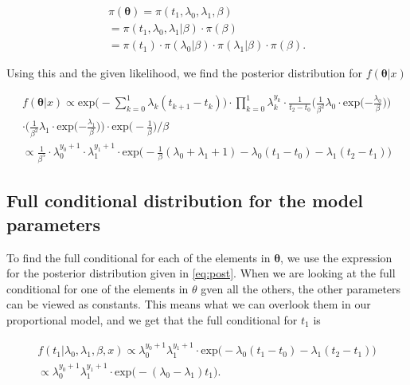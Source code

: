 \begin{align}
    \pi(\boldsymbol{\theta}) 
    = \pi(t_1, \lambda_0, \lambda_1, \beta) \nonumber \\
    = \pi(t_1, \lambda_0, \lambda_1 | \beta) \cdot \pi(\beta) \nonumber \\
    = \pi(t_1) \cdot \pi(\lambda_0|\beta) \cdot \pi(\lambda_1|\beta) \cdot \pi(\beta).
\end{align}

Using this and the given likelihood, we find the posterior distribution for $f(\boldsymbol{\theta}|x)$

\begin{align} \label{eq:post}
    f(\boldsymbol{\theta}|x) \propto \text{exp} \Big( - \sum_{k = 0}^1 \lambda_k (t_{k+1} - t_k) \Big)\cdot \prod_{k = 0}^1 \lambda_k^{y_k} \cdot \frac{1}{t_2-t_0} 
    \Big( \frac{1}{\beta^2} \lambda_0 \cdot
    \text{exp} \Big({-\frac{\lambda_0}{\beta}} \Big)  \Big) \nonumber \\ 
    \cdot \Big( \frac{1}{\beta^2} \lambda_1 \cdot \text{exp} \Big({-\frac{\lambda_1}{\beta}} \Big) \Big) \cdot \text{exp} \Big( -\frac{1}{\beta} \Big)/\beta \nonumber \\
    \propto   \frac{1}{\beta^5} \cdot \lambda_0^{y_0 + 1} \cdot \lambda_1^{y_1 + 1} \cdot \text{exp} \Big( -\frac{1}{\beta}(\lambda_0 + \lambda_1 + 1) - \lambda_0(t_1-t_0) - \lambda_1(t_2-t_1) \Big)
\end{align}




\subsection{Full conditional distribution for the model parameters} \label{full_cond}

To find the full conditional for each of the elements in $\boldsymbol{\theta}$, we use the expression for the posterior distribution given in \eqref{eq:post}. When we are looking at the full conditional for one of the elements in $\theta$ gven all the others, the other parameters can be viewed as constants. This means what we can overlook them in our proportional model, and we get that the full conditional for $t_1$ is

\begin{align}
    f(t_1 | \lambda_0, \lambda_1, \beta, x) \propto 
    \lambda_0^{y_0 + 1} \lambda_1^{y_1 + 1} \cdot \text{exp} \Big( -\lambda_0(t_1 - t_0) - \lambda_1 (t_2 - t_1) \Big) \nonumber \\
    \propto  \lambda_0^{y_0 + 1} \lambda_1^{y_1 + 1} \cdot \text{exp} \Big( -(\lambda_0 - \lambda_1)t_1 \Big).
\end{align}

